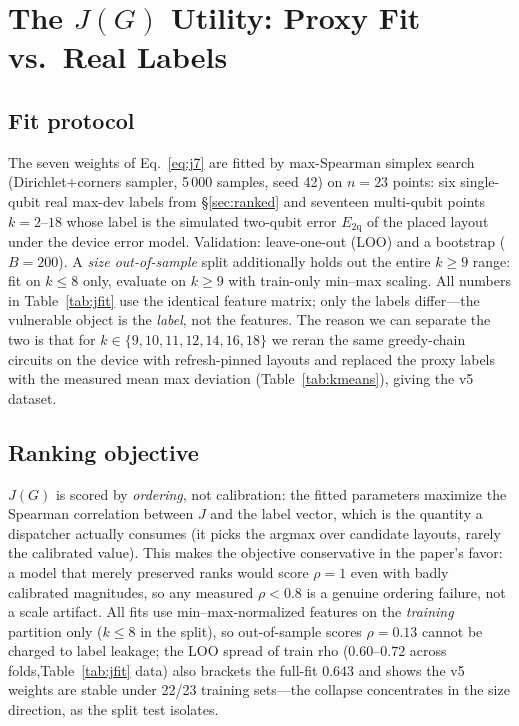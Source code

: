 \documentclass[journal,10pt,twocolumn]{IEEEtran}
\begin{document}
\section{The \texorpdfstring{$J(G)$}{J(G)} Utility: Proxy Fit vs.\ Real Labels}
\label{sec:jreal}

\subsection{Fit protocol}
The seven weights of Eq.~\eqref{eq:j7} are fitted by max-Spearman simplex search (Dirichlet$+$corners sampler,
5\,000 samples, seed 42) on $n{=}23$ points: six single-qubit real max-dev labels from \S\ref{sec:ranked} and
seventeen multi-qubit points $k{=}2$--$18$ whose label is the simulated two-qubit error
$E_{\mathrm{2q}}$ of the placed layout under the device error model. Validation: leave-one-out (LOO) and a
bootstrap ($B{=}200$). A \emph{size out-of-sample} split additionally holds out the entire $k{\ge}9$ range: fit on
$k{\le}8$ only, evaluate on $k{\ge}9$ with train-only min--max scaling. All numbers in Table~\ref{tab:jfit} use the
identical feature matrix; only the labels differ---the vulnerable object is the \emph{label}, not the features.
The reason we can separate the two is that for $k\in\{9,10,11,12,14,16,18\}$ we reran the same greedy-chain
circuits on the device with refresh-pinned layouts and replaced the proxy labels with the measured mean max
deviation (Table~\ref{tab:kmeans}), giving the v5 dataset.

\subsection{Ranking objective}
$J(G)$ is scored by \emph{ordering}, not calibration: the fitted parameters maximize the Spearman correlation
between $J$ and the label vector, which is the quantity a dispatcher actually consumes (it picks the argmax over
candidate layouts, rarely the calibrated value). This makes the objective conservative in the paper's favor: a
model that merely preserved ranks would score $\rho{=}1$ even with badly calibrated magnitudes, so any measured
$\rho<0.8$ is a genuine ordering failure, not a scale artifact. All fits use min--max-normalized features on the
\emph{training} partition only ($k\le8$ in the split), so out-of-sample scores $\rho{=}0.13$ cannot be charged to
label leakage; the LOO spread of train rho ($0.60$--$0.72$ across folds,Table~\ref{tab:jfit} data) also brackets
the full-fit $0.643$ and shows the v5 weights are stable under 22/23 training sets---the collapse concentrates in
the size direction, as the split test isolates.
\end{document}
